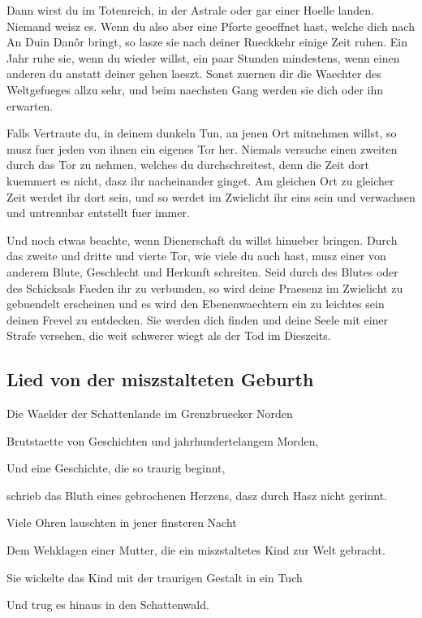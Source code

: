 \documentclass[a5paper,8pt]{book}
\begin{document}
Dann wirst du im Totenreich, in der Astrale oder gar einer Hoelle landen. Niemand weisz es.
Wenn du also aber eine Pforte geoeffnet hast, welche dich nach An Duin Danôr bringt, so lasze sie nach deiner Rueckkehr einige Zeit ruhen. Ein Jahr ruhe sie, wenn du wieder willst, ein paar Stunden mindestens, wenn einen anderen du anstatt deiner gehen laeszt. Sonst zuernen dir die Waechter des Weltgefueges allzu sehr, und beim naechsten Gang werden sie dich oder ihn erwarten.

Falls Vertraute du, in deinem dunkeln Tun, an jenen Ort mitnehmen willst, so musz fuer jeden von ihnen ein eigenes Tor her. Niemals versuche einen zweiten durch das Tor zu nehmen, welches du durchschreitest, denn die Zeit dort kuemmert es nicht, dasz ihr nacheinander ginget. Am gleichen Ort zu gleicher Zeit werdet ihr dort sein, und so werdet im Zwielicht ihr eins sein und verwachsen und untrennbar entstellt fuer immer.

Und noch etwas beachte, wenn Dienerschaft du willst hinueber bringen. Durch das zweite und dritte und vierte Tor, wie viele du auch hast, musz einer von anderem Blute, Geschlecht und Herkunft schreiten. Seid durch des Blutes oder des Schicksals Faeden ihr zu verbunden, so wird deine Praesenz im Zwielicht zu gebuendelt erscheinen und es wird den Ebenenwaechtern ein zu leichtes sein deinen Frevel zu entdecken. Sie werden dich finden und deine Seele mit einer Strafe versehen, die weit schwerer wiegt als der Tod im Dieszeits.

\newpage

\subsection{ Lied von der miszstalteten Geburth}

Die Waelder der Schattenlande im Grenzbruecker Norden

Brutstaette von Geschichten und jahrhundertelangem Morden,

Und eine Geschichte, die so traurig beginnt,

schrieb das Bluth eines gebrochenen Herzens, dasz durch Hasz nicht gerinnt.

Viele Ohren lauschten in jener finsteren Nacht

Dem Wehklagen einer Mutter, die ein miszstaltetes Kind zur Welt gebracht.

Sie wickelte das Kind mit der traurigen Gestalt in ein Tuch

Und trug es hinaus in den Schattenwald.
\end{document}
